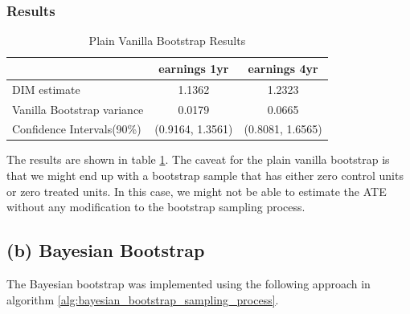 \documentclass[11pt]{article}
\numberwithin{equation}{section}
\begin{document}
\subsubsection{Results}


\begin{table}[h]
    \centering
    \begin{tabular}{lcc}
        \hline
         & earnings 1yr & earnings 4yr \\
        \hline
        DIM estimate & 1.1362  & 1.2323 \\
        Vanilla Bootstrap variance & 0.0179 & 0.0665 \\
        Confidence Intervals(90\%) & (0.9164, 1.3561) & (0.8081, 1.6565) \\
        \hline
    \end{tabular}
    \caption{\label{tab:bootstrap_results}Plain Vanilla Bootstrap Results}
\end{table}

The results are shown in table \ref{tab:bootstrap_results}.
The caveat for the plain vanilla bootstrap is that we might end up with a bootstrap sample that has either zero control units or zero treated units.
In this case, we might not be able to estimate the ATE without any modification to the bootstrap sampling process.



\newpage


\subsection{(b) Bayesian Bootstrap}

The Bayesian bootstrap was implemented using the following approach in algorithm \ref{alg:bayesian_bootstrap_sampling_process}.
\end{document}
